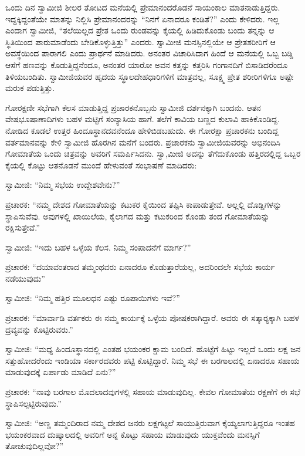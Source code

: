  ಒಂದು ದಿನ ಸ್ವಾಮೀಜಿ ಶೀಲರ ತೋಟದ ಮನೆಯಲ್ಲಿ ಪ್ರೇಮಾನಂದರೊಡನೆ ಸಾಯಂಕಾಲ ಮಾತನಾಡುತ್ತಿದ್ದರು. ಇದ್ದಕ್ಕಿದ್ದಂತೆಯೇ ಮಾತನ್ನು ನಿಲ್ಲಿಸಿ ಪ್ರೇಮಾನಂದರನ್ನು “ನಿನಗೆ ಏನಾದರೂ ಕಂಡಿತೆ?” ಎಂದು ಕೇಳಿದರು. ಇಲ್ಲ ಎಂದಾಗ ಸ್ವಾಮೀಜಿ, “ತಲೆಯಿಲ್ಲದ ಪ್ರೇತ ಒಂದು ರುಂಡವನ್ನು ಕೈಯಲ್ಲಿ ಹಿಡಿದುಕೊಂಡು ಬಂದು ತನ್ನನ್ನು ಆ ಸ್ಥಿತಿಯಿಂದ ಪಾರುಮಾಡೆಂದು ಬೇಡಿಕೊಳ್ಳುತ್ತಿತ್ತು” ಎಂದರು. ಸ್ವಾಮೀಜಿ ಮನಸ್ಸಿನಲ್ಲಿಯೇ ಆ ಪ್ರೇತಶರೀರಿಗೆ ಆ ಅವಸ್ಥೆಯಿಂದ ಪಾರಾಗಲಿ ಎಂದು ಪ್ರಾರ್ಥನೆ ಮಾಡಿದರು. ಅನಂತರ ವಿಚಾರಿಸಿದಾಗ ಹಿಂದೆ ಆ ಮನೆಯಲ್ಲಿ ಒಬ್ಬ ಬಡ್ಡಿ ಆಸೆಗೆ ಹಣವನ್ನು ಕೊಡುತ್ತಿದ್ದನೆಂದೂ, ಅನಂತರ ಯಾರೋ ಅವನ ಕತ್ತನ್ನು ಕತ್ತರಿಸಿ ಗಂಗಾನದಿಗೆ ಬಿಸಾಡಿದರೆಂದೂ ತಿಳಿಯಬಂದಿತು. ಸ್ವಾಮೀಜಿಯವರ ಹೃದಯ ಸ್ಥೂಲದೇಹಧಾರಿಗಳಿಗೆ ಮಾತ್ರವಲ್ಲ, ಸೂಕ್ಷ್ಮ ಪ್ರೇತ ಶರೀರಿಗಳಿಗೂ ಅಷ್ಟೇ ಮರುಕ ಪಡುತ್ತಿತ್ತು. 

 ಗೋರಕ್ಷಣೀ ಸಭೆಗಾಗಿ ಕೆಲಸ ಮಾಡುತ್ತಿದ್ದ ಪ್ರಚಾರಕನೊಬ್ಬನು ಸ್ವಾಮೀಜಿ ದರ್ಶನಕ್ಕಾಗಿ ಬಂದನು. ಆತನ ವೇಷಭೂಷಾಣಾದಿಗಳು ಬಹಳ ಮಟ್ಟಿಗೆ ಸಂನ್ಯಾಸಿಯ ಹಾಗೆ. ತಲೆಗೆ ಕಾವಿಯ ಬಣ್ಣದ ಕುಲಾವಿ ಹಾಕಿಕೊಂಡಿದ್ದ. ನೋಡಿದ ಕೂಡಲೆ ಉತ್ತರ ಹಿಂದೂಸ್ಥಾನದವನೆಂದೂ ಹೇಳಿಬಿಡಬಹುದು. ಈ ಗೋರಕ್ಷಾ ಪ್ರಚಾರಕನು ಬಂದಿದ್ದ ವರ್ತಮಾನವನ್ನು ಕೇಳಿ ಸ್ವಾಮೀಜಿ ಹೊರಗಿನ ಮನೆಗೆ ಬಂದರು. ಪ್ರಚಾರಕನು ಸ್ವಾಮೀಜಿಯವರನ್ನು ಅಭಿನಂದಿಸಿ ಗೋಮಾತೆಯ ಒಂದು ಚಿತ್ರವನ್ನು ಅವರಿಗೆ ಸಮರ್ಪಿಸಿದನು. ಸ್ವಾ,ಮೀಜಿ ಅದನ್ನು ತೆಗೆದುಕೊಂಡು ಹತ್ತಿರದಲ್ಲಿದ್ದ ಒಬ್ಬರ ಕೈಯಲ್ಲಿ ಕೊಟ್ಟು ಆತನೊಡನೆ ಮುಂದೆ ಹೇಳುವಂತೆ ಸಂಭಾಷಣೆ ಮಾದಿದರು: 

 ಸ್ವಾಮೀಜಿ: “ನಿಮ್ಮ ಸಭೆಯ ಉದ್ದೇಶವೇನು?” 

 ಪ್ರಚಾರಕ: “ನಮ್ಮ ದೇಶದ ಗೋಮಾತೆಯನ್ನು ಕಟುಕರ ಕೈಯಿಂದ ತಪ್ಪಿಸಿ ಕಾಪಾಡುತ್ತೇವೆ. ಅಲ್ಲಲ್ಲಿ ದೊಡ್ಡಿಗಳನ್ನು ಸ್ಥಾಪಿಸುವೆವು. ಅವುಗಳಲ್ಲಿ ಖಾಯಿಲೆಯ, ಕೈಲಾಗದ ಮತ್ತು ಕಟುಕರಿಂದ ಕೊಂಡು ತಂದ ಗೋಮಾತೆಯನ್ನು ರಕ್ಷಿಸುತ್ತೇವೆ.” 

 ಸ್ವಾಮೀಜಿ: “ಇದು ಬಹಳ ಒಳ್ಳೆಯ ಕೆಲಸ. ನಿಮ್ಮ ಸಂಪಾದನೆಗೆ ಮಾರ್ಗ?” 

 ಪ್ರಚಾರಕ: “ದಯಾವಂತರಾದ ತಮ್ಮಂಥವರು ಏನಾದರೂ ಕೊಡುತ್ತಾರೆಯಲ್ಲ, ಅದರಿಂದಲೇ ಸಭೆಯ ಕಾರ್ಯ ನಡೆಯುವುದು” 

 ಸ್ವಾಮೀಜಿ: “ನಿಮ್ಮ ಹತ್ತಿರ ಮೂಲಧನ ಎಷ್ಟು ರೂಪಾಯಿಗಳು ಇವೆ?” 

 ಪ್ರಚಾರಕ: “ಮಾರ್ವಾಡಿ ವರ್ತಕರು ಈ ನಮ್ಮ ಕಾರ್ಯಕ್ಕೆ ಒಳ್ಳೆಯ ಪೋಷಕರಾಗಿದ್ದಾರೆ. ಅವರು ಈ ಸತ್ಕಾರ‍್ಯಕ್ಕಾಗಿ ಬಹಳ ದ್ರವ್ಯವನ್ನು ಕೊಟ್ಟಿರುವರು.” 

 ಸ್ವಾಮೀಜಿ: “ಮಧ್ಯ ಹಿಂದೂಸ್ಥಾನದಲ್ಲಿ ಎಂತಹ ಭಯಂಕರ ಕ್ಷಾಮ ಬಂದಿದೆ. ಹೊಟ್ಟೆಗೆ ಹಿಟ್ಟು ಇಲ್ಲದೆ ಒಂದು ಲಕ್ಷ ಜನ ಸತ್ತುಹೋದರೆಂದು ಇಂಡಿಯಾ ಸರ್ಕಾರದವರು ಪಟ್ಟಿ ಕೊಟ್ಟಿದ್ದಾರೆ. ನಿಮ್ಮ ಸಭೆ ಈ ಬರಗಾಲದಲ್ಲಿ ಏನಾದರೂ ಸಹಾಯ ಮಾಡುವುದಕ್ಕೆ ಏರ್ಪಾಡು ಮಾಡಿದೆ ಏನು?” 

 ಪ್ರಚಾರಕ: “ನಾವು ಬರಗಾಲ ಮೊದಲಾದವುಗಳಲ್ಲಿ ಸಹಾಯ ಮಾಡುವುದಿಲ್ಲ. ಕೇವಲ ಗೋಮಾತೆಯ ರಕ್ಷಣೆಗೆ ಈ ಸಭೆ ಸ್ಥಾಪಿಸಲ್ಪಟ್ಟಿರುವುದು.” 

 ಸ್ವಾಮೀಜಿ: “ಅಣ್ಣ ತಮ್ಮಂದಿರಾದ ನಮ್ಮ ದೇಶದ ಜನರು ಲಕ್ಷಗಟ್ಟಲೆ ಸಾಯುತ್ತಿರುವಾಗ ಕೈಯ್ಯಲಾಗುತ್ತಿದ್ದರೂ ಇಂತಹ ಭಯಂಕರವಾದ ದುಷ್ಕಾಲದಲ್ಲಿ ಅವರಿಗೆ ಅನ್ನ ಕೊಟ್ಟು ಸಹಾಯ ಮಾಡುವುದು ಯುಕ್ತವೆಂದು ಮನಸ್ಸಿಗೆ ತೋಚುವುದಿಲ್ಲವೋ?” 

